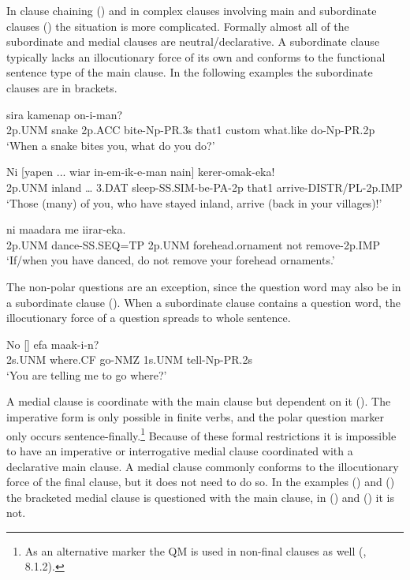 In clause chaining () and in complex clauses involving main and subordinate clauses () the situation is more complicated. Formally almost all of the subordinate and medial clauses are neutral/declarative. A subordinate clause typically lacks an illocutionary force of its own \citep[32]{Cristofaro2003} and conforms to the functional sentence type of the main clause. In the following examples the subordinate clauses are in brackets.

\ea%
\label{ex:x1357}
  sira  kamenap on-i-man?\\
2p.UNM  snake  2p.ACC  bite-Np-PR.3s  that1  custom  what.like do-Np-PR.2p\\
\glt `When a snake bites you, what do you do?'
\z


\ea%
\label{ex:x1897}
\gll Ni  [yapen  ...  wiar  in-em-ik-e-man  nain] kerer-omak-eka!\\
2p.UNM  inland  {\dots}  3.DAT  sleep-SS.SIM-be-PA-2p  that1 arrive-DISTR/PL-2p.IMP\\
\glt `Those (many) of you, who have stayed inland, arrive (back in your villages)!'
\z


\ea%
\label{ex:x1898}
\gll [Ni  uf-ep-na]  ni  maadara  me iirar-eka.\\
2p.UNM  dance-SS.SEQ=TP  2p.UNM  forehead.ornament  not remove-2p.IMP\\
\glt `If/when you have danced, do not remove your forehead ornaments.'
\z

The non-polar questions are an exception, since the question word may also be in a subordinate clause (). When a subordinate clause contains a question word, the illocutionary force of a question spreads to whole sentence. 

\ea%
\label{ex:x1362}
\gll No  []  efa  maak-i-n?\\
2s.UNM  where.CF  go-NMZ  1s.UNM  tell-Np-PR.2s\\
\glt `You are telling me to go where?'
\z

A medial clause is coordinate with the main clause but dependent on it (). The imperative form is only possible in finite verbs, and the polar question marker only occurs sentence-finally.\footnote{As an alternative marker the QM is used in non-final clauses as well (, 8.1.2).} Because of these formal restrictions it is impossible to have an imperative or interrogative medial clause coordinated with a declarative main clause. A medial clause commonly conforms to the illocutionary force of the final clause, but it does not need to do so. In the examples () and () the bracketed medial clause is questioned with the main clause, in () and () it is not.  


